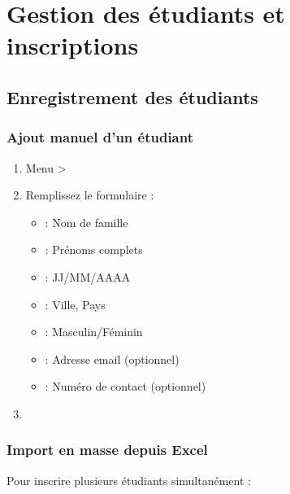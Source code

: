 \section{Gestion des étudiants et inscriptions}

\subsection{Enregistrement des étudiants}

\subsubsection{Ajout manuel d'un étudiant}

\begin{enumerate}[leftmargin=*]
    \item Menu  > 
    \item Remplissez le formulaire :
    \begin{itemize}
        \item {} : Nom de famille
        \item {} : Prénoms complets
        \item {} : JJ/MM/AAAA
        \item {} : Ville, Pays
        \item {} : Masculin/Féminin
        \item {} : Adresse email (optionnel)
        \item {} : Numéro de contact (optionnel)
    \end{itemize}
    \item {}
\end{enumerate}


\subsubsection{Import en masse depuis Excel}

Pour inscrire plusieurs étudiants simultanément :

